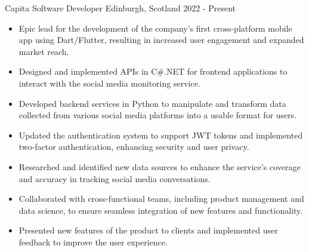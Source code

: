 
  \cventry
    {Capita} %
    {Software Developer} %
    {Edinburgh, Scotland} %
    {2022 - Present} %
    {
        \begin{itemize}
            \item Epic lead for the development of the company's first cross-platform mobile app using Dart/Flutter, resulting in increased user engagement and expanded market reach.
            \item Designed and implemented APIs in C\#.NET for frontend applications to interact with the social media monitoring service.
            \item Developed backend services in Python to manipulate and transform data collected from various social media platforms into a usable format for users.
            \item Updated the authentication system to support JWT tokens and implemented two-factor authentication, enhancing security and user privacy.
            \item Researched and identified new data sources to enhance the service's coverage and accuracy in tracking social media conversations.
            \item Collaborated with cross-functional teams, including product management and data science, to ensure seamless integration of new features and functionality.
            \item Presented new features of the product to clients and implemented user feedback to improve the user experience.
        \end{itemize}
    }